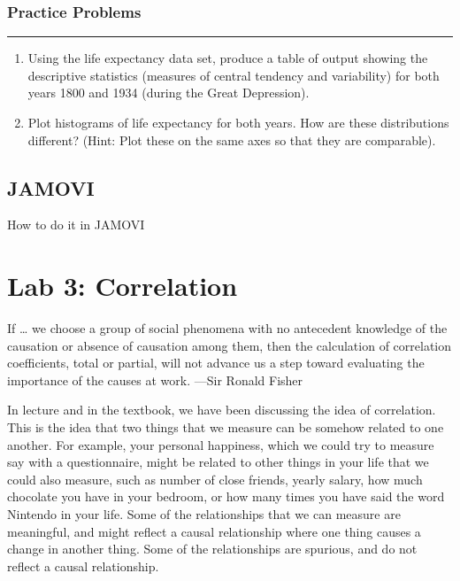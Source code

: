 \documentclass[]{book}
\begin{document}
\subsection{Practice Problems}\label{practice-problems-1}

\begin{center}\rule{0.5\linewidth}{0.5pt}\end{center}

\begin{enumerate}
\def\labelenumi{\arabic{enumi}.}
\item
  Using the life expectancy data set, produce a table of output showing
  the descriptive statistics (measures of central tendency and
  variability) for both years 1800 and 1934 (during the Great
  Depression).
\item
  Plot histograms of life expectancy for both years. How are these
  distributions different? (Hint: Plot these on the same axes so that
  they are comparable).
\end{enumerate}

\section{JAMOVI}\label{jamovi-2}

How to do it in JAMOVI

\chapter{Lab 3: Correlation}\label{lab-3-correlation}

{ If \ldots{} we choose a group of social phenomena with no antecedent
knowledge of the causation or absence of causation among them, then the
calculation of correlation coefficients, total or partial, will not
advance us a step toward evaluating the importance of the causes at
work. ---Sir Ronald Fisher }

In lecture and in the textbook, we have been discussing the idea of
correlation. This is the idea that two things that we measure can be
somehow related to one another. For example, your personal happiness,
which we could try to measure say with a questionnaire, might be related
to other things in your life that we could also measure, such as number
of close friends, yearly salary, how much chocolate you have in your
bedroom, or how many times you have said the word Nintendo in your life.
Some of the relationships that we can measure are meaningful, and might
reflect a causal relationship where one thing causes a change in another
thing. Some of the relationships are spurious, and do not reflect a
causal relationship.
\end{document}
